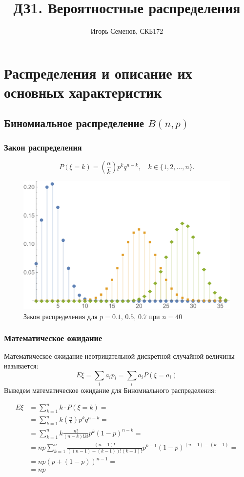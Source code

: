 \documentclass[a4paper]{article}
\title{ДЗ1. Вероятностные распределения}
\author{Игорь Семенов, СКБ172}
\begin{document}
\maketitle



\section{Распределения и описание их основных характеристик}

\subsection{Биномиальное распределение $B(n,p)$ }
\subsubsection{Закон распределения}
$$P(\xi=k)=(\frac{n}{k})p^{k}q^{n-k},\quad k\in\{1,2,\ldots,n\}.$$

\begin{figure}[h!]
    \centering
    \includegraphics[scale=0.5]{BinomPDF.pdf}
    \caption{Закон распределения для $p=0.1,\,0.5,\,0.7$ при $n=40$
}
\end{figure}


\subsubsection{Математическое ожидание}
Математическое ожидание неотрицательной дискретной случайной величины называется:
$$E\xi = \sum_{i}a_ip_i=\sum_{i}a_iP(\xi=a_i)$$ Выведем математическое ожидание для Биномиального распределения:

\begin{equation*}
	\begin{split}
	E\xi   &= \sum_{k=1}^{n}k\cdot P(\xi=k)=\\
				&=\sum_{k=1}^{n}k(\frac{n}{k})p^{k}q^{n-k}=\\
				&=\sum_{k=1}^{n}k\frac{n!}{(n-k)!k!}p^{k}(1-p)^{n-k}=\\
				&=np\sum_{k=1}^{n}\frac{(n-1)!}{((n-1)-(k-1))!(k-1)!}p^{k-1}(1-p)^{(n-1)-(k-1)}=\\
                &=np(p+(1-p))^{n-1}=\\
                &=np
	\end{split}
\end{equation*}
\end{document}
